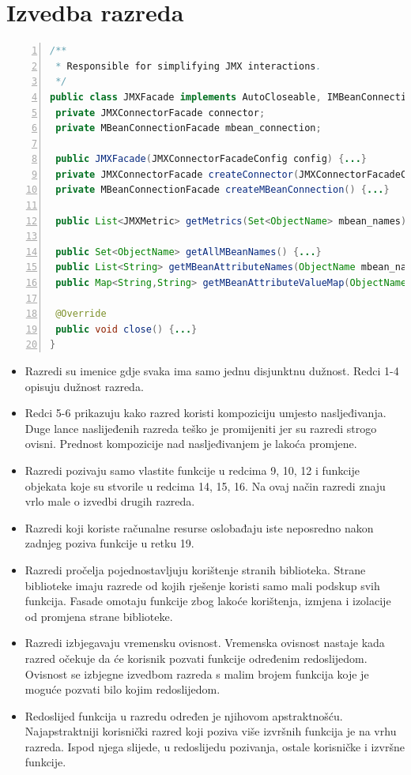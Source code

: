 \documentclass[utf8, diplomski, lmodern, numeric]{fer}
\begin{document}
\section{Izvedba razreda}

\begin{lstlisting}[floatplacement=H, language=Java, caption={Projekt JMXMan}, captionpos=b, basicstyle=\footnotesize, numbers=left, stepnumber=1, backgroundcolor=\color{backcolour}, keywordstyle=\color{blue}, breaklines]
/**
 * Responsible for simplifying JMX interactions.
 */
public class JMXFacade implements AutoCloseable, IMBeanConnectionFacade {
 private JMXConnectorFacade connector;
 private MBeanConnectionFacade mbean_connection;

 public JMXFacade(JMXConnectorFacadeConfig config) {...}
 private JMXConnectorFacade createConnector(JMXConnectorFacadeConfig config) {...}
 private MBeanConnectionFacade createMBeanConnection() {...}
  
 public List<JMXMetric> getMetrics(Set<ObjectName> mbean_names) {...}
  
 public Set<ObjectName> getAllMBeanNames() {...}
 public List<String> getMBeanAttributeNames(ObjectName mbean_name) {...}
 public Map<String,String> getMBeanAttributeValueMap(ObjectName mbean_name, List<String> attributes) {...}
 
 @Override
 public void close() {...}
}
\end{lstlisting}

\begin{itemize}
    \item Razredi su imenice gdje svaka ima samo jednu disjunktnu dužnost. Redci 1-4 opisuju dužnost razreda.
    \item Redci 5-6 prikazuju kako razred koristi kompoziciju umjesto nasljeđivanja. Duge lance naslijeđenih razreda teško je promijeniti jer su razredi strogo ovisni. Prednost kompozicije nad nasljeđivanjem je lakoća promjene.
    \item Razredi pozivaju samo vlastite funkcije u redcima 9, 10, 12 i funkcije objekata koje su stvorile u redcima 14, 15, 16. Na ovaj način razredi znaju vrlo male o izvedbi drugih razreda.
    \item Razredi koji koriste računalne resurse oslobađaju iste neposredno nakon zadnjeg poziva funkcije u retku 19.
    \item Razredi pročelja pojednostavljuju korištenje stranih biblioteka. Strane biblioteke imaju razrede od kojih rješenje koristi samo mali podskup svih funkcija. Fasade omotaju funkcije zbog lakoće korištenja, izmjena i izolacije od promjena strane biblioteke.
    \item Razredi izbjegavaju vremensku ovisnost. Vremenska ovisnost nastaje kada razred očekuje da će korisnik pozvati funkcije određenim redoslijedom. Ovisnost se izbjegne izvedbom razreda s malim brojem funkcija koje je moguće pozvati bilo kojim redoslijedom.
    \item Redoslijed funkcija u razredu određen je njihovom apstraktnošću. Najapstraktniji korisnički razred koji poziva više izvršnih funkcija je na vrhu razreda. Ispod njega slijede, u redoslijedu pozivanja, ostale korisničke i izvršne funkcije.
\end{itemize}
\end{document}
